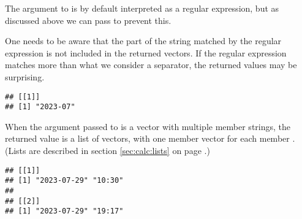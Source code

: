 \documentclass[krantz2]{krantz}\usepackage{knitr}
\begin{document}
The argument to  is by default interpreted as a regular expression, but as discussed above we can pass  to prevent this.

\begin{warningbox}
One needs to be aware that the part of the string matched by the regular expression is not included in the returned vectors. If the regular expression matches more than what we consider a separator, the returned values may be surprising.

\begin{knitrout}\footnotesize
{}\color{fgcolor}\begin{kframe}
\begin{alltt}
\hlstd{(} \hlstd{=} \hlstd{,}  \hlstd{=} \hlstd{)}
\end{alltt}
\begin{verbatim}
## [[1]]
## [1] "2023-07"
\end{verbatim}
\end{kframe}
\end{knitrout}

\end{warningbox}

\begin{explainbox}
When the argument passed to  is a vector with multiple member strings, the returned value is a list of  vectors, with one member vector for each member . (Lists are described in section \ref{sec:calc:lists} on page \pageref{sec:calc:lists}.)

\begin{knitrout}\footnotesize
{}\color{fgcolor}\begin{kframe}
\begin{alltt}
\hlstd{(} \hlstd{=} \hlstd{(}\hlstd{,} \hlstd{),}  \hlstd{=} \hlstd{)}
\end{alltt}
\begin{verbatim}
## [[1]]
## [1] "2023-07-29" "10:30"     
## 
## [[2]]
## [1] "2023-07-29" "19:17"
\end{verbatim}
\end{kframe}
\end{knitrout}

\end{explainbox}
\end{document}
